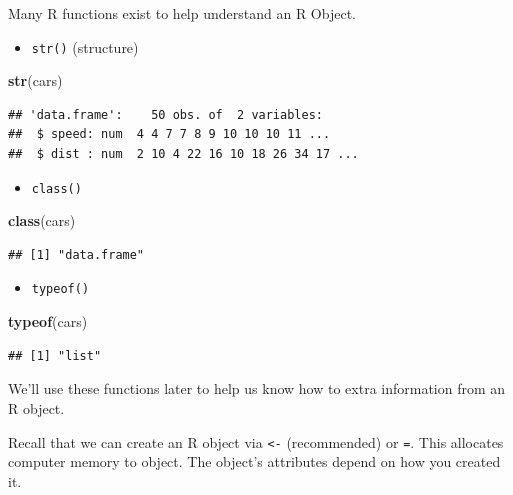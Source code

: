 \documentclass[
]{book}
\newenvironment{Shaded}{\begin{snugshade}}{\end{snugshade}}
\newcommand{\KeywordTok}[1]{\textcolor[rgb]{0.13,0.29,0.53}{\textbf{#1}}}
\newcommand{\NormalTok}[1]{#1}
\providecommand{\tightlist}{%
  \setlength{\itemsep}{0pt}\setlength{\parskip}{0pt}}
\theoremstyle{definition}
\theoremstyle{definition}
\theoremstyle{definition}
\theoremstyle{remark}
\begin{document}
Many R functions exist to help understand an R Object.

\begin{itemize}
\tightlist
\item
  \texttt{str()} (structure)
\end{itemize}

\begin{Shaded}
\begin{Highlighting}[]
\KeywordTok{str}\NormalTok{(cars)}
\end{Highlighting}
\end{Shaded}

\begin{verbatim}
## 'data.frame':    50 obs. of  2 variables:
##  $ speed: num  4 4 7 7 8 9 10 10 10 11 ...
##  $ dist : num  2 10 4 22 16 10 18 26 34 17 ...
\end{verbatim}

\begin{itemize}
\tightlist
\item
  \texttt{class()}
\end{itemize}

\begin{Shaded}
\begin{Highlighting}[]
\KeywordTok{class}\NormalTok{(cars)}
\end{Highlighting}
\end{Shaded}

\begin{verbatim}
## [1] "data.frame"
\end{verbatim}

\begin{itemize}
\tightlist
\item
  \texttt{typeof()}
\end{itemize}

\begin{Shaded}
\begin{Highlighting}[]
\KeywordTok{typeof}\NormalTok{(cars)}
\end{Highlighting}
\end{Shaded}

\begin{verbatim}
## [1] "list"
\end{verbatim}

We'll use these functions later to help us know how to extra information from an R object.

Recall that we can create an R object via \texttt{\textless{}-} (recommended) or \texttt{=}. This allocates computer memory to object. The object's attributes depend on how you created it.
\end{document}
